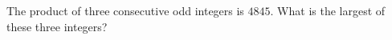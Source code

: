 The product of three consecutive odd integers is $4845$. What is the largest of these three integers?
